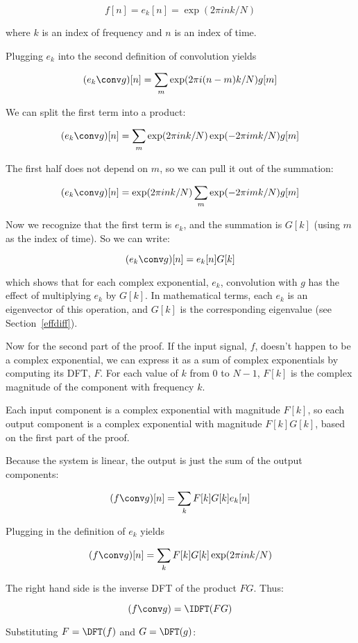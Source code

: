 \documentclass[12pt]{book} \usepackage[width=5.5in,height=8.5in, hmarginratio=3:2,vmarginratio=1:1]{geometry}
\begin{document}
%
\[ f[n] = e_k[n] = \exp(2 \pi i n k / N) \] 

%
where $k$ is an index of frequency and $n$ is an index of time. 

Plugging $e_k$ into the second definition of convolution yields 

%
\[ (e_k \conv g)[n] = \sum_m \exp(2 \pi i (n-m) k / N) g[m] \] 

%
We can split the first term into a product: 

%
\[ (e_k \conv g)[n] = \sum_m \exp(2 \pi i n k / N) \exp(-2 \pi i m k / N) g[m] \] 

%
The first half does not depend on $m$, so we can pull it out of the summation: 

%
\[ (e_k \conv g)[n] = \exp(2 \pi i n k / N) \sum_m \exp(-2 \pi i m k / N) g[m] \] 

%
Now we recognize that the first term is $e_k$, and the summation is $G[k]$ (using $m$ as the index of time). So we can write: 

%
\[ (e_k \conv g)[n] = e_k[n] G[k] \] 

%
which shows that for each complex exponential, $e_k$, convolution with $g$ has the effect of multiplying $e_k$ by $G[k]$. In mathematical terms, each $e_k$ is an eigenvector of this operation, and $G[k]$ is the corresponding eigenvalue (see Section~\ref{effdiff}). 

Now for the second part of the proof. If the input signal, $f$, doesn't happen to be a complex exponential, we can express it as a sum of complex exponentials by computing its DFT, $F$. For each value of $k$ from 0 to $N-1$, $F[k]$ is the complex magnitude of the component with frequency $k$. 

Each input component is a complex exponential with magnitude $F[k]$, so each output component is a complex exponential with magnitude $F[k] G[k]$, based on the first part of the proof. 

Because the system is linear, the output is just the sum of the output components: 

%
\[ (f \conv g)[n] = \sum_k F[k] G[k] e_k[n] \] 

%
Plugging in the definition of $e_k$ yields 

%
\[ (f \conv g)[n] = \sum_k F[k] G[k] \exp(2 \pi i n k / N) \] 

%
The right hand side is the inverse DFT of the product $F G$. Thus: 

%
\[ (f \conv g) = \IDFT( F G ) \] 

%
Substituting $F = \DFT(f)$ and $G = \DFT(g)$: 
\end{document}
